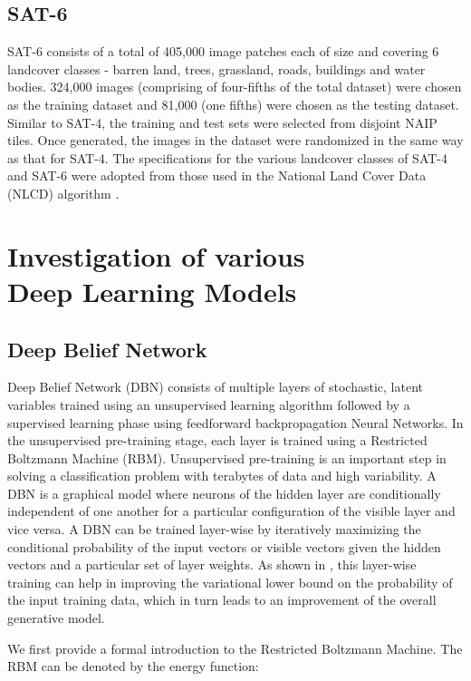 \documentclass[11pt,a4paper]{article}
\begin{document}
\subsection{SAT-6}
SAT-6 consists of a total of 405,000 image patches each of size  and covering 6 landcover classes - barren land, trees, grassland, roads, buildings and water bodies. 324,000 images (comprising of four-fifths of the total dataset) were chosen as the training dataset and 81,000 (one fifths) were chosen as the testing dataset. Similar to SAT-4, the training and test sets were selected from disjoint NAIP tiles. Once generated, the images in the dataset were randomized in the same way as that for SAT-4. The specifications for the various landcover classes of SAT-4 and SAT-6 were adopted from those used in the National Land Cover Data (NLCD) algorithm \cite{nlcd_desc}.

\section{Investigation of various \\
Deep Learning Models}

\subsection{Deep Belief Network} \label{sec:DBN}
Deep Belief Network (DBN) consists of multiple layers of stochastic, latent variables trained using an unsupervised learning algorithm followed by a supervised learning phase using feedforward backpropagation Neural Networks.  In the unsupervised pre-training stage, each layer is trained using a Restricted Boltzmann Machine (RBM). Unsupervised pre-training is an important step in solving a classification problem with terabytes of data and high variability.  A DBN is a graphical model \cite{Koller2009} where neurons of the hidden layer are conditionally independent of one another for a particular configuration of the visible layer and vice versa. A DBN can be trained layer-wise by iteratively maximizing the conditional probability of the input vectors or visible vectors given the hidden vectors and a particular set of layer weights. As shown in \cite{Hinton06afast}, this layer-wise training can help in improving the variational lower bound on the probability of the input training data, which in turn leads to an improvement of the overall generative model. 

We first provide a formal introduction to the Restricted Boltzmann Machine.  
The RBM can be denoted by the energy function:
\end{document}
